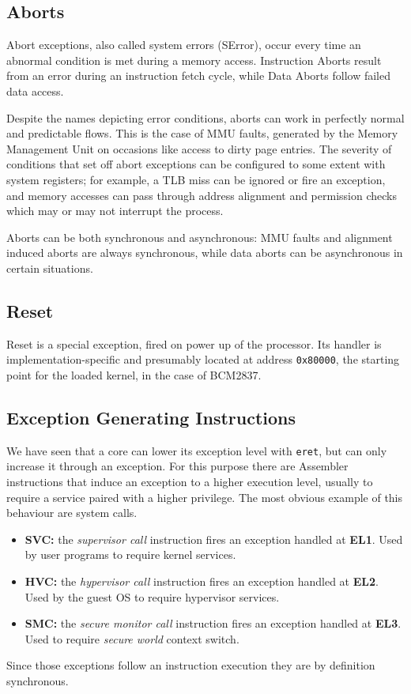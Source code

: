 \documentclass[12pt,a4paper,openright,twoside]{report}
\begin{document}
\subsection{Aborts}
Abort exceptions, also called system errors (SError), occur every time an abnormal
condition is met during a memory access. Instruction Aborts result from an error
during an instruction fetch cycle, while Data Aborts follow failed data access.

Despite the names depicting error conditions, aborts can work in perfectly normal
and predictable flows. This is the case of MMU faults, generated by the Memory
Management Unit on occasions like access to dirty page entries.
The severity of conditions that set off abort exceptions can be configured to 
some extent with system registers; for example, a TLB miss can be ignored or 
fire an exception, and memory accesses can pass through address alignment 
and permission checks which may or may not interrupt the process.

Aborts can be both synchronous and asynchronous: MMU faults and alignment induced 
aborts are always synchronous, while data aborts can be asynchronous in certain
situations.

\subsection{Reset}
Reset is a special exception, fired on power up of the processor. Its handler is 
implementation-specific and presumably located at address {\tt 0x80000}, the starting
point for the loaded kernel, in the case of BCM2837.

\subsection{Exception Generating Instructions}
We have seen that a core can lower its exception level with {\tt eret}, but can
only increase it through an exception. For this purpose there are Assembler instructions
that induce an exception to a higher execution level, usually to require a service 
paired with a higher privilege. The most obvious example of this behaviour are
system calls.
\begin{itemize}
    \item \textbf{SVC:} the \textit{supervisor call} instruction fires an exception
        handled at \textbf{EL1}. Used by user programs to require kernel services.
    \item \textbf{HVC:} the \textit{hypervisor call} instruction fires an exception
        handled at \textbf{EL2}. Used by the guest OS to require hypervisor services.
    \item \textbf{SMC:} the \textit{secure monitor call} instruction fires an exception
        handled at \textbf{EL3}. Used to require \textit{secure world} context
        switch.
\end{itemize}
Since those exceptions follow an instruction execution they are by definition
synchronous.
\end{document}
